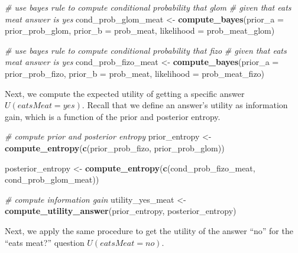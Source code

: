 \documentclass[english,floatsintext,man]{apa6}
\newenvironment{Shaded}{\begin{snugshade}}{\end{snugshade}}
\newcommand{\KeywordTok}[1]{\textcolor[rgb]{0.13,0.29,0.53}{\textbf{#1}}}
\newcommand{\DataTypeTok}[1]{\textcolor[rgb]{0.13,0.29,0.53}{#1}}
\newcommand{\StringTok}[1]{\textcolor[rgb]{0.31,0.60,0.02}{#1}}
\newcommand{\CommentTok}[1]{\textcolor[rgb]{0.56,0.35,0.01}{\textit{#1}}}
\newcommand{\NormalTok}[1]{#1}
\theoremstyle{definition}
\theoremstyle{definition}
\theoremstyle{definition}
\theoremstyle{remark}
\begin{document}
\begin{Shaded}
\begin{Highlighting}[]
\CommentTok{# use bayes rule to compute conditional probability that glom }
\CommentTok{# given that eats meat answer is yes}
\NormalTok{cond_prob_glom_meat <-}\StringTok{ }\KeywordTok{compute_bayes}\NormalTok{(}\DataTypeTok{prior_a =}\NormalTok{ prior_prob_glom, }
                                     \DataTypeTok{prior_b =}\NormalTok{ prob_meat, }
                                     \DataTypeTok{likelihood =}\NormalTok{ prob_meat_glom)}

\CommentTok{# use bayes rule to compute conditional probability that fizo }
\CommentTok{# given that eats meat answer is yes}
\NormalTok{cond_prob_fizo_meat <-}\StringTok{ }\KeywordTok{compute_bayes}\NormalTok{(}\DataTypeTok{prior_a =}\NormalTok{ prior_prob_fizo, }
                                     \DataTypeTok{prior_b =}\NormalTok{ prob_meat, }
                                     \DataTypeTok{likelihood =}\NormalTok{ prob_meat_fizo)}
\end{Highlighting}
\end{Shaded}

\noindent
Next, we compute the expected utility of getting a specific answer
\(U(eatsMeat = yes)\). Recall that we define an answer's utility as
information gain, which is a function of the prior and posterior
entropy.

\begin{Shaded}
\begin{Highlighting}[]
\CommentTok{# compute prior and posterior entropy}
\NormalTok{prior_entropy <-}\StringTok{ }\KeywordTok{compute_entropy}\NormalTok{(}\KeywordTok{c}\NormalTok{(prior_prob_fizo, }
\NormalTok{                                   prior_prob_glom))}

\NormalTok{posterior_entropy <-}\StringTok{ }\KeywordTok{compute_entropy}\NormalTok{(}\KeywordTok{c}\NormalTok{(cond_prob_fizo_meat, }
\NormalTok{                                       cond_prob_glom_meat))}

\CommentTok{# compute information gain}
\NormalTok{utility_yes_meat <-}\StringTok{ }\KeywordTok{compute_utility_answer}\NormalTok{(prior_entropy, }
\NormalTok{                                           posterior_entropy)}
\end{Highlighting}
\end{Shaded}

\noindent
Next, we apply the same procedure to get the utility of the answer
\enquote{no} for the \enquote{eats meat?} question \(U(eatsMeat = no)\).
\end{document}
